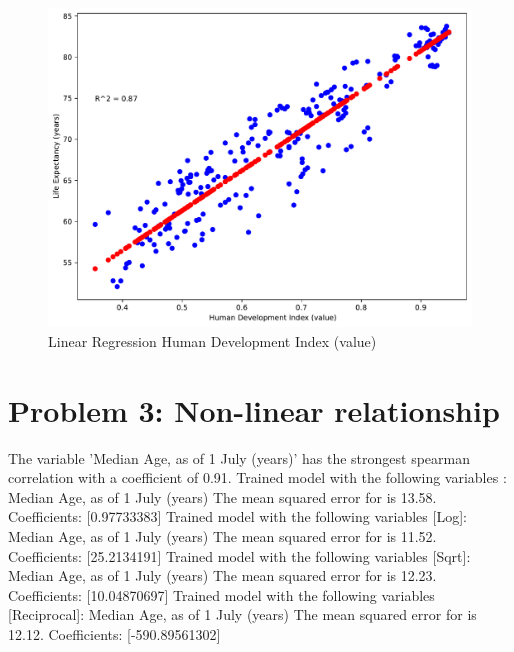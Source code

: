 \documentclass[a4paper]{article}
\begin{document}
\begin{figure}[h]
  \begin{center}
    \includegraphics[width=\textwidth]{ola/_linear_regression_human_development_index_(value).pdf}
    \caption{Linear Regression Human Development Index (value)}
    \label{fig:reg_human_development_index}
  \end{center}
\end{figure}

\section*{Problem 3: Non-linear relationship}

The variable 'Median Age, as of 1 July (years)' has the strongest spearman correlation with a coefficient of 0.91.
Trained model with the following variables :  Median Age, as of 1 July (years)
The mean squared error for is 13.58.
Coefficients:  [0.97733383]
Trained model with the following variables [Log]:  Median Age, as of 1 July (years)
The mean squared error for is 11.52.
Coefficients:  [25.2134191]
Trained model with the following variables [Sqrt]:  Median Age, as of 1 July (years)
The mean squared error for is 12.23.
Coefficients:  [10.04870697]
Trained model with the following variables [Reciprocal]:  Median Age, as of 1 July (years)
The mean squared error for is 12.12.
Coefficients:  [-590.89561302]
\end{document}
